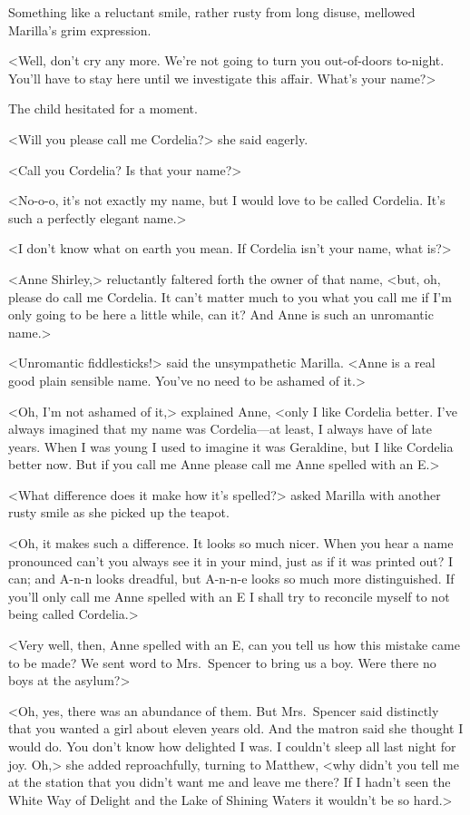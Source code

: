 Something like a reluctant smile, rather rusty from long disuse, mellowed Marilla's grim expression.

<Well, don't cry any more. We're not going to turn you out-of-doors to-night. You'll have to stay here until we investigate this affair. What's your name?>

The child hesitated for a moment.

<Will you please call me Cordelia?> she said eagerly.

<Call you Cordelia? Is that your name?>

<No-o-o, it's not exactly my name, but I would love to be called Cordelia. It's such a perfectly elegant name.>

<I don't know what on earth you mean. If Cordelia isn't your name, what is?>

<Anne Shirley,> reluctantly faltered forth the owner of that name, <but, oh, please do call me Cordelia. It can't matter much to you what you call me if I'm only going to be here a little while, can it? And Anne is such an unromantic name.>

<Unromantic fiddlesticks!> said the unsympathetic Marilla. <Anne is a real good plain sensible name. You've no need to be ashamed of it.>

<Oh, I'm not ashamed of it,> explained Anne, <only I like Cordelia better. I've always imagined that my name was Cordelia—at least, I always have of late years. When I was young I used to imagine it was Geraldine, but I like Cordelia better now. But if you call me Anne please call me Anne spelled with an E\@.>

<What difference does it make how it's spelled?> asked Marilla with another rusty smile as she picked up the teapot.

<Oh, it makes such a difference. It looks so much nicer. When you hear a name pronounced can't you always see it in your mind, just as if it was printed out? I can; and A-n-n looks dreadful, but A-n-n-e looks so much more distinguished. If you'll only call me Anne spelled with an E I shall try to reconcile myself to not being called Cordelia.>

<Very well, then, Anne spelled with an E, can you tell us how this mistake came to be made? We sent word to Mrs.~Spencer to bring us a boy. Were there no boys at the asylum?>

<Oh, yes, there was an abundance of them. But Mrs.~Spencer said distinctly that you wanted a girl about eleven years old. And the matron said she thought I would do. You don't know how delighted I was. I couldn't sleep all last night for joy. Oh,> she added reproachfully, turning to Matthew, <why didn't you tell me at the station that you didn't want me and leave me there? If I hadn't seen the White Way of Delight and the Lake of Shining Waters it wouldn't be so hard.>

